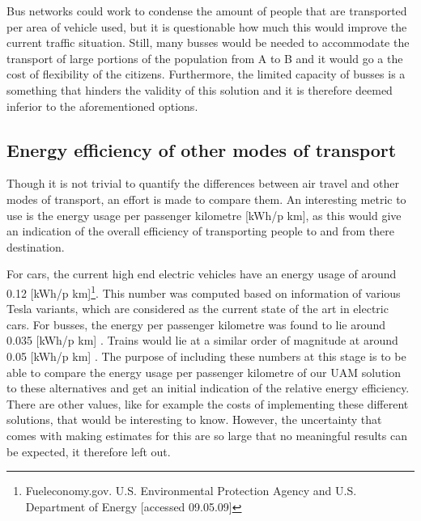 Bus networks could work to condense the amount of people that are transported per area of vehicle used, but it is questionable how much this would improve the current traffic situation. Still, many busses would be needed to accommodate the transport of large portions of the population from A to B and it would go a the cost of flexibility of the citizens. Furthermore, the limited capacity of busses is a something that hinders the validity of this solution and it is therefore deemed inferior to the aforementioned options.  


\subsection{Energy efficiency of other modes of transport}
Though it is not trivial to quantify the differences between air travel and other modes of transport, an effort is made to compare them. An interesting metric to use is the energy usage per passenger kilometre [kWh/p km], as this would give an indication of the overall efficiency of transporting people to and from there destination.

For cars, the current high end electric vehicles have an energy usage of around 0.12 [kWh/p km]\footnote{Fueleconomy.gov. U.S. Environmental Protection Agency and U.S. Department of Energy [accessed 09.05.09]}. This number was computed based on information of various Tesla variants, which are considered as the current state of the art in electric cars. For busses, the energy per passenger kilometre was found to lie around 0.035 [kWh/p km] \cite{TNOstuff} \citep{Latvianstuff}. Trains would lie at a similar order of magnitude at around 0.05 [kWh/p km] \cite{Trainstuff}. The purpose of including these numbers at this stage is to be able to compare the energy usage per passenger kilometre of our UAM solution to these alternatives and get an initial indication of the relative energy efficiency. There are other values, like for example the costs of implementing these different solutions, that would be interesting to know. However, the uncertainty that comes with making estimates for this are so large that no meaningful results can be expected, it therefore left out. 








